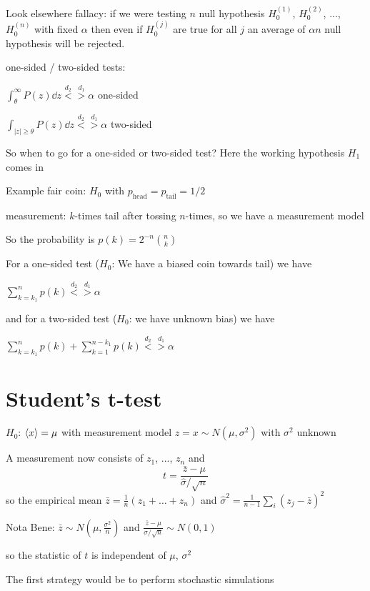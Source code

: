 \documentclass{notebook}
\begin{document}
Look elsewhere fallacy: if we were testing $n$ null hypothesis $H_0^{(1)}$, $H_0^{(2)}$, ..., $H_0^{(n)}$ with fixed $\alpha$ then even if $H_0^{(j)}$ are true for all $j$ an average of $\alpha n$ null hypothesis will be rejected. 

one-sided / two-sided tests: 

$\int_{\theta}^{\infty} P(z) \dd{z} \overset{d_2}{<} \overset{d_1}{>} \alpha$ one-sided

$\int_{|z| \geq \theta} P(z) \dd{z} \overset{d_2}{<} \overset{d_1}{>} \alpha$ two-sided

So when to go for a one-sided or two-sided test? Here the working hypothesis $H_1$ comes in 

Example fair coin: $H_0$ with $p_{\mathrm{head}} = p_{\mathrm{tail}} = 1/2$

measurement: $k$-times tail after tossing $n$-times, so we have a measurement model

So the probability is $p(k) = 2^{-n} \binom{n}{k}$

For a one-sided test ($H_0$: We have a biased coin towards tail) we have

$\sum_{k=k_1}^n p(k) \overset{d_2}{<} \overset{d_1}{>} \alpha$

and for a two-sided test ($H_0$: we have unknown bias) we have

$\sum_{k=k_1}^n p(k) + \sum_{k=1}^{n-k_1} p(k) \overset{d_2}{<} \overset{d_1}{>} \alpha$

\section{Student's t-test}

$H_0$: $\expval{x} = \mu$ with measurement model $z = x \sim N(\mu, \sigma^2)$ with $\sigma^2$ unknown

A measurement now consists of $z_1$, ..., $z_n$ and
%
\begin{equation}
	t = \frac{\bar{z}-\mu}{\hat{\sigma}/\sqrt{n}}
\end{equation}
%
so the empirical mean $\bar{z} = \frac{1}{n}(z_1 + \dots + z_n)$ and $\hat{\sigma}^2 = \frac{1}{n-1}\sum_i (z_j-\bar{z})^2$

Nota Bene: $\bar{z} \sim N(\mu, \frac{\sigma^2}{n})$ and $\frac{\bar{z}-\mu}{\sigma/\sqrt{n}} \sim N(0,1)$

so the statistic of $t$ is independent of $\mu$, $\sigma^2$

The first strategy would be to perform stochastic simulations
\end{document}
